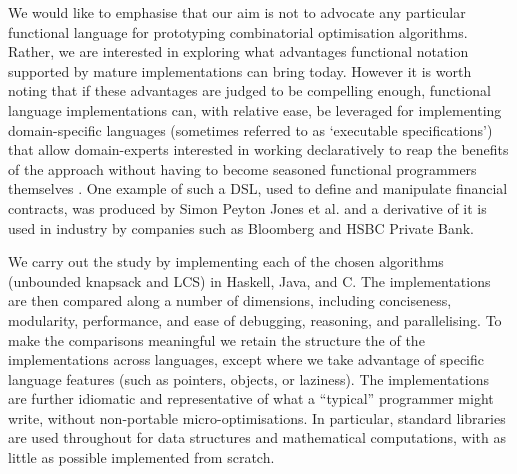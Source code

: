 We would like to emphasise that our aim is not to advocate any particular
functional language for prototyping combinatorial optimisation algorithms.
Rather, we are interested in exploring what advantages functional notation
supported by mature implementations can bring today. However it is
worth noting that if these
advantages are judged to be compelling enough, functional
language implementations can, with relative ease, be leveraged for
implementing domain-specific languages (sometimes referred to as `executable specifications') that allow domain-experts interested in
working declaratively to reap the benefits of the approach without having to
become seasoned functional programmers themselves \cite{Hudak1998}. One example
of such a DSL, used to define and manipulate financial contracts,
was produced by Simon Peyton Jones et al. \cite{contracts} and
a derivative of it is used in industry by companies such as Bloomberg
and HSBC Private Bank.

We carry out the study by implementing each of the chosen algorithms (unbounded
knapsack and LCS) in
Haskell, Java, and C. The implementations are then compared along a number
of dimensions, including conciseness, modularity, performance, and ease of debugging, reasoning, and parallelising. To make the comparisons meaningful we retain the structure the
of the implementations across languages, except where we take advantage of
specific language features (such as pointers, objects, or laziness). The
implementations are further idiomatic and representative of what a
``typical'' programmer might write, without non-portable micro-optimisations.
In particular, standard libraries are used throughout for data structures and
mathematical computations, with as little as possible implemented from
scratch.


